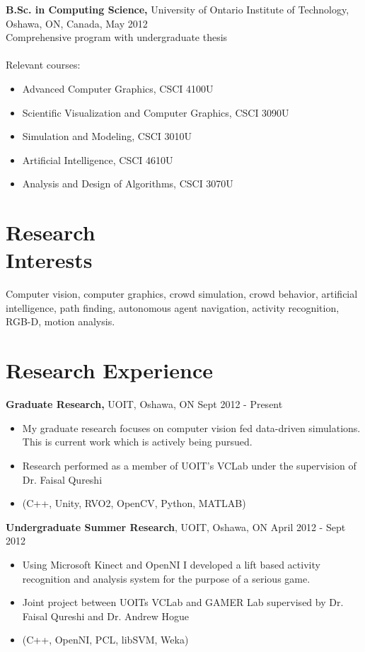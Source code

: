 \documentclass[margin]{res}
\begin{document}
\begin{resume}
{\bf B.Sc. in Computing Science,} University of Ontario Institute of Technology, \\
Oshawa, ON, Canada, May 2012 \\
Comprehensive program with undergraduate thesis \\ \\
Relevant courses:
\begin{itemize} \itemsep -2pt
\item Advanced Computer Graphics, CSCI 4100U
\item Scientific Visualization and Computer Graphics, CSCI 3090U
\item Simulation and Modeling, CSCI 3010U
\item Artificial Intelligence, CSCI 4610U
\item Analysis and Design of Algorithms, CSCI 3070U
\end{itemize}


\section{Research\\ Interests}
Computer vision, computer graphics, crowd simulation, crowd behavior, artificial intelligence, path finding, autonomous agent navigation,  activity recognition, RGB-D, motion analysis.
 
\section{Research Experience}
 {\bf Graduate Research,} UOIT, Oshawa, ON \hfill Sept 2012 - Present
 \begin{itemize} \itemsep -2pt  %
 \item My graduate research focuses on computer vision fed data-driven simulations.  This is current work which is actively being pursued.
\item Research performed as a member of UOIT's VCLab under the supervision of Dr. Faisal Qureshi
 \item (C++, Unity, RVO2, OpenCV, Python, MATLAB)
 \end{itemize}

{\bf Undergraduate Summer Research}, UOIT, Oshawa, ON \hfill April 2012 - Sept 2012
\begin{itemize} \itemsep -2pt
\item Using Microsoft Kinect and OpenNI I developed a lift based activity recognition and analysis system for the purpose of a serious game.
\item Joint project between UOITs VCLab and GAMER Lab supervised by Dr. Faisal Qureshi and Dr. Andrew Hogue
\item (C++, OpenNI, PCL, libSVM, Weka)
\end{itemize}


\end{resume}
\end{document}
